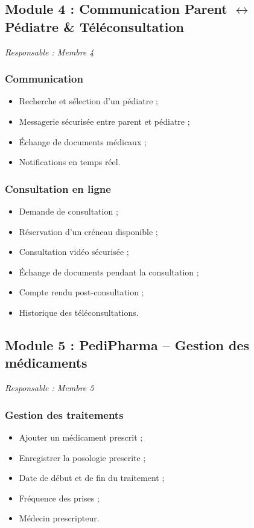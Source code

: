 \documentclass[11pt,a4paper]{article}
\begin{document}
\subsection{Module 4 : Communication Parent \texorpdfstring{$\leftrightarrow$}{<->} Pédiatre \& Téléconsultation}

\textit{Responsable : Membre 4}

\subsubsection{Communication}
\begin{itemize}
  \item Recherche et sélection d'un pédiatre ;
  \item Messagerie sécurisée entre parent et pédiatre ;
  \item Échange de documents médicaux ;
  \item Notifications en temps réel.
\end{itemize}

\subsubsection{Consultation en ligne}
\begin{itemize}
  \item Demande de consultation ;
  \item Réservation d'un créneau disponible ;
  \item Consultation vidéo sécurisée ;
  \item Échange de documents pendant la consultation ;
  \item Compte rendu post-consultation ;
  \item Historique des téléconsultations.
\end{itemize}

\subsection{Module 5 : PediPharma -- Gestion des médicaments}

\textit{Responsable : Membre 5}

\subsubsection{Gestion des traitements}
\begin{itemize}
  \item Ajouter un médicament prescrit ;
  \item Enregistrer la posologie prescrite ;
  \item Date de début et de fin du traitement ;
  \item Fréquence des prises ;
  \item Médecin prescripteur.
\end{itemize}
\end{document}
